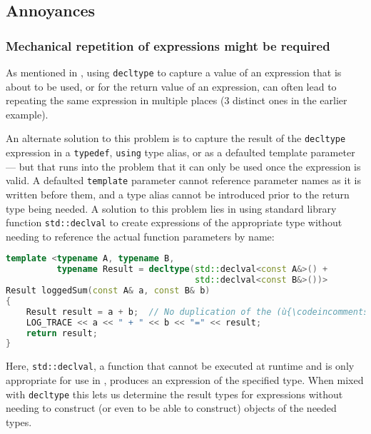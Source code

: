 \subsection[Annoyances]{Annoyances}\label{annoyances-decltype}

\subsubsection{Mechanical repetition of expressions might be required}\label{decltype-mechanical}

As mentioned in
,
using \lstinline!decltype! to capture a value of an expression that is about to be used, or for the return value of an expression, can often lead to repeating the same expression in multiple places (3 distinct ones in the earlier example).

An alternate solution to this problem is to capture the result of the \lstinline!decltype! expression in a \lstinline!typedef!, \lstinline!using! type alias, or as a defaulted template parameter --- but that runs into the problem that it can only be used once the expression is valid.  A defaulted \lstinline!template! parameter cannot reference parameter names as it is written before them, and a type alias cannot be introduced prior to the return type being needed.  A solution to this problem lies in using standard library function \lstinline!std::declval! to create expressions of the appropriate type without needing to reference the actual function parameters by name:

\begin{lstlisting}[language=C++]
template <typename A, typename B,
          typename Result = decltype(std::declval<const A&>() +
                                     std::declval<const B&>())>
Result loggedSum(const A& a, const B& b)
{
    Result result = a + b;  // No duplication of the (ù{\codeincomments{decltype}}ù) expression
    LOG_TRACE << a << " + " << b << "=" << result;
    return result;
}
\end{lstlisting}

Here, \lstinline!std::declval!, a function that cannot be executed at runtime and is only appropriate for use in , produces an expression of the specified type.  When mixed with \lstinline!decltype! this lets us determine the result types for expressions without needing to construct (or even to be able to construct) objects of the needed types.

